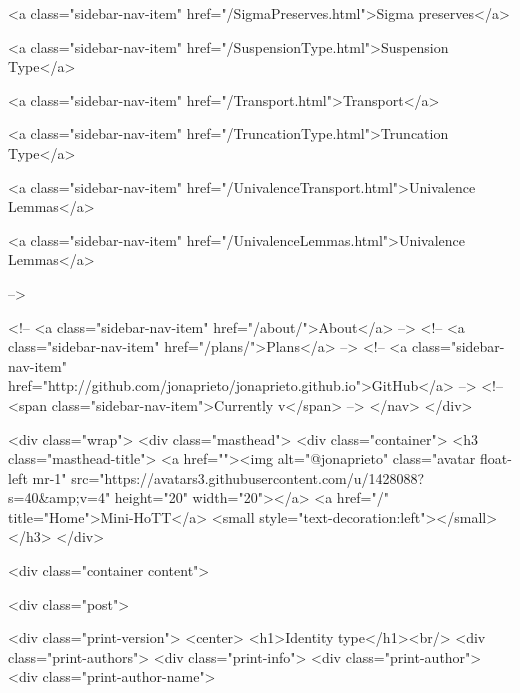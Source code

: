       
        
          <a class="sidebar-nav-item" href="/SigmaPreserves.html">Sigma preserves</a>
        
      
    
      
        
          <a class="sidebar-nav-item" href="/SuspensionType.html">Suspension Type</a>
        
      
    
      
        
          <a class="sidebar-nav-item" href="/Transport.html">Transport</a>
        
      
    
      
        
          <a class="sidebar-nav-item" href="/TruncationType.html">Truncation Type</a>
        
      
    
      
        
          <a class="sidebar-nav-item" href="/UnivalenceTransport.html">Univalence Lemmas</a>
        
      
    
      
        
          <a class="sidebar-nav-item" href="/UnivalenceLemmas.html">Univalence Lemmas</a>
        
      
     -->

    <!-- <a class="sidebar-nav-item" href="/about/">About</a> -->
    <!-- <a class="sidebar-nav-item" href="/plans/">Plans</a> -->
    <!-- <a class="sidebar-nav-item" href="http://github.com/jonaprieto/jonaprieto.github.io">GitHub</a> -->
    <!-- <span class="sidebar-nav-item">Currently v</span> -->
  </nav>
</div>

    <div class="wrap">
      <div class="masthead">
        <div class="container">
          <h3 class="masthead-title">
            <a href=""><img alt="@jonaprieto" class="avatar float-left mr-1" src="https://avatars3.githubusercontent.com/u/1428088?s=40&amp;v=4" height="20" width="20"></a>
            <a href="/" title="Home">Mini-HoTT</a>
            <small style="text-decoration:left"></small>
          </h3>
        </div>
      
      <div class="container content">
        







<div class="post">

  <div class="print-version">
    <center>
      <h1>Identity type</h1><br/>
        <div class="print-authors">
          <div class="print-info">
            <div class="print-author">
              <div class="print-author-name">
                
